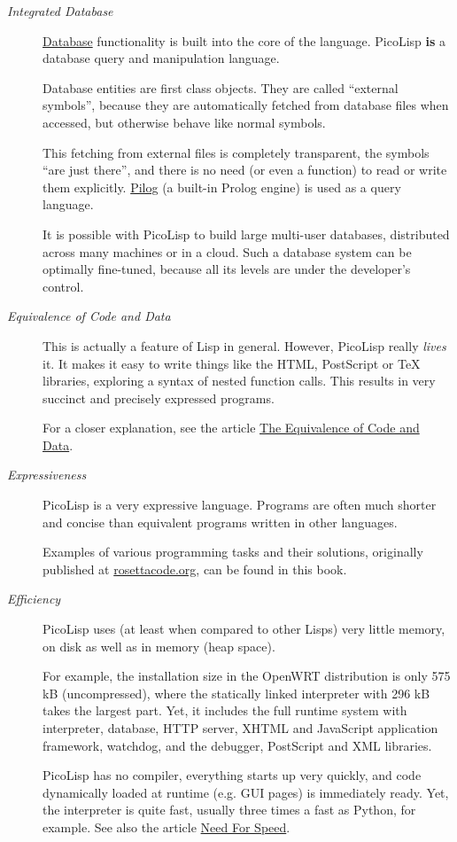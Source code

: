 \begin{description}
\item[\emph{Integrated Database}]
  \href{http://software-lab.de/doc/ref.html\#dbase}{Database}
functionality is built into the core of the language. PicoLisp
\textbf{is} a database query and manipulation language.

Database entities are first class objects. They are called ``external
symbols'', because they are automatically fetched from database files
when accessed, but otherwise behave like normal symbols.

This fetching from external files is completely transparent, the
symbols ``are just there'', and there is no need (or even a function)
to read or write them explicitly.
\href{http://software-lab.de/doc/ref.html\#pilog}{Pilog} (a built-in
Prolog engine) is used as a query language.

It is possible with PicoLisp to build large multi-user databases,
distributed across many machines or in a cloud. Such a database system
can be optimally fine-tuned, because all its levels are under the
developer's control.

\item[\emph{Equivalence of Code and Data}]

  This is actually a feature of Lisp in general. However, PicoLisp
  really \emph{lives} it. It makes it easy to write things like the
  HTML, PostScript or TeX libraries, exploring a syntax of nested
  function calls. This results in very succinct and precisely
  expressed programs.

For a closer explanation, see the article
\href{!wiki?EquivalenceCodeData}{The Equivalence of Code and Data}.

\item[\emph{Expressiveness}] PicoLisp is a very expressive language. Programs
are often much shorter and concise than equivalent programs written in
other languages.

Examples of various programming tasks and their solutions, originally
published at
\href{http://rosettacode.org/wiki/Category:PicoLisp}{rosettacode.org},
can be found in this book.

\item[\emph{Efficiency}] 

PicoLisp uses (at least when compared to other
Lisps) very little memory, on disk as well as in memory (heap space).

For example, the installation size in the OpenWRT distribution is only
575 kB (uncompressed), where the statically linked interpreter with
296 kB takes the largest part. Yet, it includes the full runtime
system with interpreter, database, HTTP server, XHTML and JavaScript
application framework, watchdog, and the debugger, PostScript and XML
libraries.

PicoLisp has no compiler, everything starts up very quickly, and code
dynamically loaded at runtime (e.g. GUI pages) is immediately ready.
Yet, the interpreter is quite fast, usually three times a fast as
Python, for example. See also the article
\href{!wiki?NeedForSpeed}{Need For Speed}.
\end{description}


